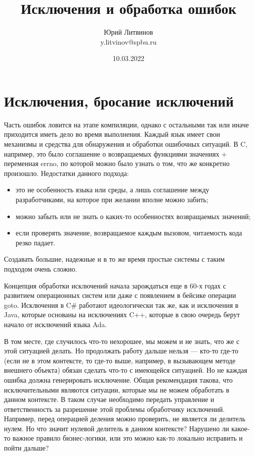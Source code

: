 \documentclass[a5paper]{article}
\title{Исключения и обработка ошибок}
\author{Юрий Литвинов\\\small{y.litvinov@spbu.ru}}
\date{10.03.2022}
\begin{document}
\maketitle
\thispagestyle{empty}

\section{Исключения, бросание исключений}

Часть ошибок ловится на этапе компиляции, однако с остальными так или иначе приходится иметь дело во время выполнения. Каждый язык имеет свои механизмы и средства для обнаружения и обработки ошибочных ситуаций. В C, например, это было соглашение о возвращаемых функциями значениях + переменная errno, по которой можно было узнать о том, что же конкретно произошло. Недостатки данного подхода:

\begin{itemize}
    \item это не особенность языка или среды, а лишь соглашение между разработчиками, на которое при желании вполне можно забить;
    \item можно забыть или не знать о каких-то особенностях возвращаемых значений;
    \item если проверять значение, возвращаемое каждым вызовом, читаемость кода резко падает.
\end{itemize}

Создавать большие, надежные и в то же время простые системы с таким подходом очень сложно.

Концепция обработки исключений начала зарождаться еще в 60-х годах с развитием операционных систем или даже с появлением в бейсике операции goto. Исключения в C\# работают идеологически так же, как и исключения в Java, которые основаны на исключениях C++, которые в свою очередь берут начало от исключений языка Ada.

В том месте, где случилось что-то нехорошее, мы можем и не знать, что же с этой ситуацией делать. Но продолжать работу дальше нельзя --- кто-то где-то (если не в этом контексте, то где-то выше, например, в вызывающем методе внешнего объекта) обязан сделать что-то с имеющейся ситуацией. Но не каждая ошибка должна генерировать исключение. Общая рекомендация такова, что исключительными являются ситуации, которые мы не можем обработать в данном контексте. В таком случае необходимо передать управление и ответственность за разрешение этой проблемы обработчику исключений. Например, перед операцией деления можно проверить, не является ли делитель нулем. Но что значит нулевой делитель в данном контексте? Нарушено ли какое-то важное правило бизнес-логики, или это можно как-то локально исправить и пойти дальше?
\end{document}
